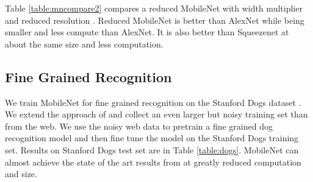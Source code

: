 \documentclass[10pt,twocolumn,letterpaper]{article}
\begin{document}
Table \ref{table:mncompare2} compares a reduced MobileNet with width multiplier  and reduced resolution . Reduced MobileNet is  better than AlexNet \cite{krizhevsky2012imagenet} while being  smaller and  less compute than AlexNet. It is also  better than Squeezenet \cite{iandola2016squeezenet} at about the same size and  less computation.

\begin{table}[t]
  \caption{MobileNet Comparison to Popular Models} \centering {}
\end{table}

\begin{table}[t]
  \caption{Smaller MobileNet Comparison to Popular Models} \centering {}
\end{table}

\subsection{Fine Grained Recognition}
We train MobileNet for fine grained recognition on the Stanford Dogs dataset \cite{KhoslaYaoJayadevaprakashFeiFei_FGVC2011}.
We extend the approach of \cite{krause2015unreasonable} and collect an even larger but noisy training set than \cite{krause2015unreasonable} from the web.
We use the noisy web data to pretrain a fine grained dog recognition model and then fine tune the model on the Stanford Dogs training set.
Results on Stanford Dogs test set are in Table \ref{table:dogs}. MobileNet can almost achieve the state of the art results from
\cite{krause2015unreasonable} at greatly reduced computation and size.
\end{document}

